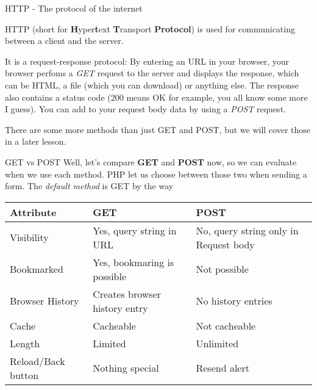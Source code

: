 \begin{frame}{HTTP - The protocol of the internet}

	HTTP (short for \textbf{H}yper\textbf{t}ext \textbf{T}ransport \textbf{Protocol}) is used for communicating between a client and the server.\pause
	 
	It is a request-response protocol:
	By entering an URL in your browser, your browser perfoms a \emph{GET} request to the server and displays the response, which can be HTML, a file (which you can download) or anything else. The response also contains a status code (200 means OK for example, you all know some more I guess). \pause You can add to your request body data by using a \emph{POST} request. 
	
	There are some more methods than just GET and POST, but we will cover those in a later lesson.
\end{frame}

\begin{frame}{GET vs POST}
	Well, let's compare \textbf{GET} and \textbf{POST} now, so we can evaluate when we use each method. PHP let us choose between those two when sending a form. The \emph{default method} is GET by the way \pause
	\begin{center}
	
		\begin{tabular}{m{2.5cm} | m{3cm} | m{3cm}}
		Attribute & GET & POST \\
		\hline \pause
		Visibility & \pause Yes, query string in URL & No, query string only in Request body \\
		\hline \pause
		Bookmarked & \pause Yes, bookmaring is possible & Not possible \\
		\hline \pause
		Browser History & \pause Creates browser history entry & No history entries \\
		\hline \pause
		Cache & \pause Cacheable & Not cacheable \\
		\hline \pause
		Length & \pause Limited & Unlimited\\
		\hline \pause
		Reload/Back button & \pause Nothing special & Resend alert \\
		\end{tabular}
	
	\end{center}
	
\end{frame}

